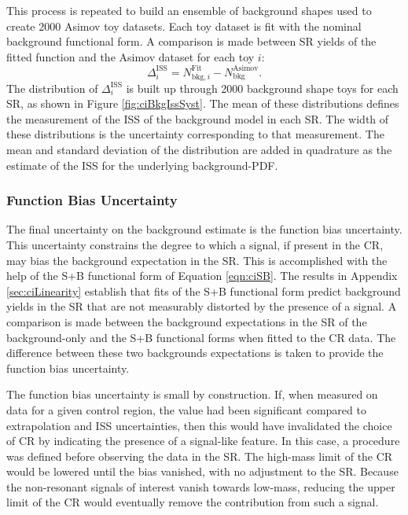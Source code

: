 This process is repeated to build an ensemble of background shapes used to create 2000 Asimov toy datasets.
Each toy dataset is fit with the nominal background functional form.
A comparison is made between SR yields of the fitted function and the Asimov dataset for each toy $i$:
\begin{equation*}
    \Delta_i^\text{ISS}=N_{\text{bkg},i}^\text{Fit}-N_\text{bkg}^\text{Asimov}.
\end{equation*}
The distribution of $\Delta_i^\text{ISS}$ is built up through 2000 background shape toys for each SR, as shown in Figure \ref{fig:ciBkgIssSyst}.
The mean of these distributions defines the measurement of the ISS of the background model in each SR.
The width of these distributions is the uncertainty corresponding to that measurement.
The mean and standard deviation of the distribution are added in quadrature as the estimate of the ISS for the underlying background-PDF.

\subsubsection{Function Bias Uncertainty}

The final uncertainty on the background estimate is the function bias uncertainty.
This uncertainty constrains the degree to which a signal, if present in the CR, may bias the background expectation in the SR.
This is accomplished with the help of the S+B functional form of Equation \ref{eqn:ciSB}.
The results in Appendix \ref{sec:ciLinearity} establish that fits of the S+B functional form predict background yields in the SR that are not measurably distorted by the presence of a signal.
A comparison is made between the background expectations in the SR of the background-only and the S+B functional forms when fitted to the CR data.
The difference between these two backgrounds expectations is taken to provide the function bias uncertainty.

The function bias uncertainty is small by construction.
If, when measured on data for a given control region, the value had been significant compared to extrapolation and ISS uncertainties, then this would have invalidated the choice of CR by indicating the presence of a signal-like feature.
In this case, a procedure was defined before observing the data in the SR.
The high-mass limit of the CR would be lowered until the bias vanished, with no adjustment to the SR. 
Because the non-resonant signals of interest vanish towards low-mass, reducing the upper limit of the CR would eventually remove the contribution from such a signal.

